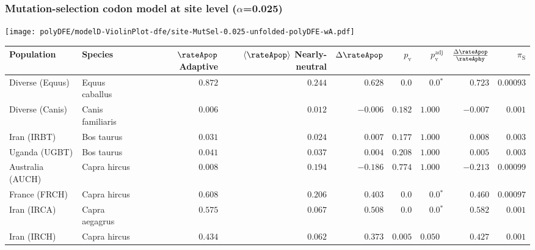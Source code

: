 \subsubsection*{Mutation-selection codon model at site level ($\alpha$=0.025)}
\begin{center}
    \texttt{[image: polyDFE/modelD-ViolinPlot-dfe/site-MutSel-0.025-unfolded-polyDFE-wA.pdf]}
    \begin{adjustbox}{width = 1\textwidth}
        \begin{tabular}{|l|l|r|r|r|r|r|r|r|}
            \toprule
            Population & Species & \specialcell{$\rateApop$ \\ Adaptive}                & \specialcell{$\left< \rateApop \right>$ \\ Nearly-neutral}                & $\Delta \rateApop $    & $p_{\mathrm{v}}$ & $p_{\mathrm{v}}^{\mathrm{adj}}$ & $\frac{\Delta\rateApop}{\rateAphy}$ & $\pi_{\textrm{S}}$ \\
            \midrule
            Diverse (Equus)                    & Equus caballus          & $ 0.872$ & $ 0.244$ & $ 0.628$ & $0.0$ & $\bm{0.0{^*}}$     & $ 0.723$ & $0.00093$  \\
            Diverse (Canis)                  & Canis familiaris          & $ 0.006$ & $ 0.012$ & $-0.006$ & $ 0.182$ & $ 1.000~~$     & $-0.007$ & $ 0.001$ \\
            Iran (IRBT)               & Bos taurus        & $ 0.031$ & $ 0.024$ & $ 0.007$ & $ 0.177$ & $ 1.000~~$     & $ 0.008$ & $ 0.003$ \\
            Uganda (UGBT)                  & Bos taurus        & $ 0.041$ & $ 0.037$ & $ 0.004$ & $ 0.208$    & $ 1.000~~$ & $ 0.005$ & $ 0.003$ \\
            Australia (AUCH)                    & Capra hircus      & $ 0.008$ & $ 0.194$ & $-0.186$ & $ 0.774$    & $ 1.000~~$ & $-0.213$ & $0.00099$ \\
            France (FRCH)                    & Capra hircus        & $ 0.608$ & $ 0.206$ & $ 0.403$ & $0.0$ & $\bm{0.0{^*}}$     & $ 0.460$ & $0.00097$ \\
            Iran (IRCA)                   & Capra aegagrus        & $ 0.575$ & $ 0.067$ & $ 0.508$ & $0.0$ & $\bm{0.0{^*}}$     & $ 0.582$ & $ 0.001$ \\
            Iran (IRCH)                 & Capra hircus        & $ 0.434$ & $ 0.062$ & $ 0.373$ & $ 0.005$ & $ 0.050~~$     & $ 0.427$ & $ 0.001$ \\

\end{tabular}
\end{adjustbox}
\end{center}
